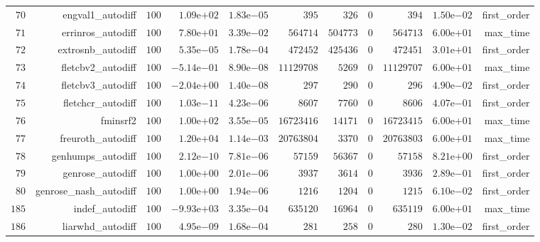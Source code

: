 \documentclass[varwidth=20cm,crop=true]{standalone}
\begin{document}
\begin{longtable}{rrrrrrrrrrr}
  \(    70\) & engval1\_autodiff & \(   100\) & \( 1.09\)e\(+02\) & \( 1.83\)e\(-05\) & \(   395\) & \(   326\) & \(     0\) & \(   394\) & \( 1.50\)e\(-02\) & first\_order \\
  \(    71\) & errinros\_autodiff & \(   100\) & \( 7.80\)e\(+01\) & \( 3.39\)e\(-02\) & \(564714\) & \(504773\) & \(     0\) & \(564713\) & \( 6.00\)e\(+01\) & max\_time \\
  \(    72\) & extrosnb\_autodiff & \(   100\) & \( 5.35\)e\(-05\) & \( 1.78\)e\(-04\) & \(472452\) & \(425436\) & \(     0\) & \(472451\) & \( 3.01\)e\(+01\) & first\_order \\
  \(    73\) & fletcbv2\_autodiff & \(   100\) & \(-5.14\)e\(-01\) & \( 8.90\)e\(-08\) & \(11129708\) & \(  5269\) & \(     0\) & \(11129707\) & \( 6.00\)e\(+01\) & max\_time \\
  \(    74\) & fletcbv3\_autodiff & \(   100\) & \(-2.04\)e\(+00\) & \( 1.40\)e\(-08\) & \(   297\) & \(   290\) & \(     0\) & \(   296\) & \( 4.90\)e\(-02\) & first\_order \\
  \(    75\) & fletchcr\_autodiff & \(   100\) & \( 1.03\)e\(-11\) & \( 4.23\)e\(-06\) & \(  8607\) & \(  7760\) & \(     0\) & \(  8606\) & \( 4.07\)e\(-01\) & first\_order \\
  \(    76\) & fminsrf2 & \(   100\) & \( 1.00\)e\(+02\) & \( 3.55\)e\(-05\) & \(16723416\) & \( 14171\) & \(     0\) & \(16723415\) & \( 6.00\)e\(+01\) & max\_time \\
  \(    77\) & freuroth\_autodiff & \(   100\) & \( 1.20\)e\(+04\) & \( 1.14\)e\(-03\) & \(20763804\) & \(  3370\) & \(     0\) & \(20763803\) & \( 6.00\)e\(+01\) & max\_time \\
  \(    78\) & genhumps\_autodiff & \(   100\) & \( 2.12\)e\(-10\) & \( 7.81\)e\(-06\) & \( 57159\) & \( 56367\) & \(     0\) & \( 57158\) & \( 8.21\)e\(+00\) & first\_order \\
  \(    79\) & genrose\_autodiff & \(   100\) & \( 1.00\)e\(+00\) & \( 2.01\)e\(-06\) & \(  3937\) & \(  3614\) & \(     0\) & \(  3936\) & \( 2.89\)e\(-01\) & first\_order \\
  \(    80\) & genrose\_nash\_autodiff & \(   100\) & \( 1.00\)e\(+00\) & \( 1.94\)e\(-06\) & \(  1216\) & \(  1204\) & \(     0\) & \(  1215\) & \( 6.10\)e\(-02\) & first\_order \\
  \(   185\) & indef\_autodiff & \(   100\) & \(-9.93\)e\(+03\) & \( 3.35\)e\(-04\) & \(635120\) & \( 16964\) & \(     0\) & \(635119\) & \( 6.00\)e\(+01\) & max\_time \\
  \(   186\) & liarwhd\_autodiff & \(   100\) & \( 4.95\)e\(-09\) & \( 1.68\)e\(-04\) & \(   281\) & \(   258\) & \(     0\) & \(   280\) & \( 1.30\)e\(-02\) & first\_order \\

\end{longtable}
\end{document}
